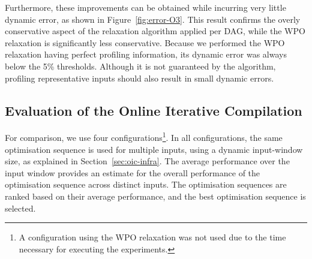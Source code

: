 \documentclass[sigplan,10pt]{acmart}
\theoremstyle{definition}
\newcommand{\IterComp}{{Iterative Compilation}}
\begin{document}
Furthermore, these improvements can be obtained while incurring very little dynamic error, as shown in Figure~\ref{fig:error-O3}.
This result confirms the overly conservative aspect of the relaxation algorithm applied per DAG,
while the WPO relaxation is significantly less conservative.
Because we performed the WPO relaxation having perfect profiling information, its dynamic error was always below the 5\% thresholds.
Although it is not guaranteed by the algorithm, profiling representative inputs should also result in small dynamic errors.

\subsection{Evaluation of the Online {\IterComp}}

For comparison, we use four configurations\footnote{A configuration using the WPO relaxation was not used due to the time necessary for executing the experiments.}.
In all configurations, the same optimisation sequence is used for multiple inputs, using a dynamic input-window size, as explained in Section~\ref{sec:oic-infra}.
The average performance over the input window provides an estimate for the overall performance of the optimisation sequence across distinct inputs.
The optimisation sequences are ranked based on their average performance, and the best optimisation sequence is selected.
\end{document}
